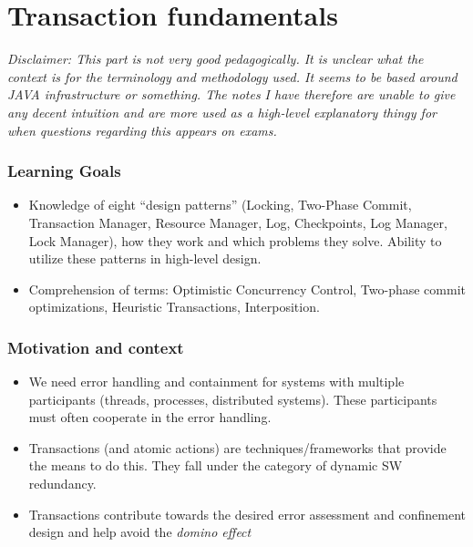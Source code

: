 \part{Transaction fundamentals}
\textit{Disclaimer: This part is not very good pedagogically. It is unclear what the context is for the terminology and methodology used. It seems to be based around JAVA infrastructure or something. The notes I have therefore are unable to give any decent intuition and are more used as a high-level explanatory thingy for when questions regarding this appears on exams.}

\section{Learning Goals}
\begin{itemize}
\item Knowledge of eight “design patterns” (Locking, Two-Phase Commit, Transaction Manager, Resource Manager, Log, Checkpoints, Log Manager, Lock Manager), how they work and which problems they solve. Ability to utilize these patterns in high-level design. 
\item Comprehension of terms: Optimistic Concurrency Control, Two-phase commit optimizations, Heuristic Transactions, Interposition.
\end{itemize}

\section{Motivation and context}
\begin{itemize}
\item We need error handling and containment for systems with multiple participants (threads, processes, distributed systems). These participants must often cooperate in the error handling.
\item Transactions (and atomic actions) are techniques/frameworks that provide the means to do this. They fall under the category of dynamic SW redundancy. 
\item Transactions contribute towards the desired error assessment and confinement design and help avoid the \textit{domino effect}
\end{itemize}

